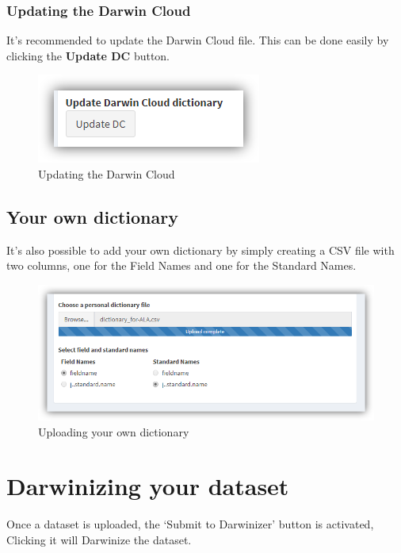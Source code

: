 \documentclass[]{book}
\theoremstyle{definition}
\theoremstyle{definition}
\theoremstyle{definition}
\theoremstyle{remark}
\begin{document}
\subsubsection*{Updating the Darwin
Cloud}\label{updating-the-darwin-cloud}

It's recommended to update the Darwin Cloud file. This can be done
easily by clicking the \textbf{Update DC} button.

\begin{figure}
\centering
\includegraphics{img/bdDwC_update-DC.png}
\caption{Updating the Darwin Cloud}
\end{figure}

\subsection{Your own dictionary}\label{your-own-dictionary}

It's also possible to add your own dictionary by simply creating a CSV
file with two columns, one for the Field Names and one for the Standard
Names.

\begin{figure}
\centering
\includegraphics{img/bdDwC_personal_dictionary.png}
\caption{Uploading your own dictionary}
\end{figure}

\section{Darwinizing your dataset}\label{darwinizing-your-dataset}

Once a dataset is uploaded, the `Submit to Darwinizer' button is
activated, Clicking it will Darwinize the dataset.
\end{document}
